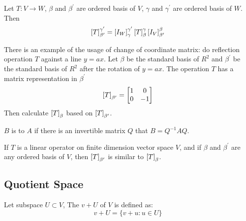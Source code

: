 \begin{theorem} \label{specialchangeofcoordinates}
	Let $T:V\rightarrow W$, $\beta$ and $\beta^\prime$ are ordered basis of $V$, $\gamma$ and $\gamma^\prime$ are ordered basis of $W$. Then
	\begin{equation}
		\coordinate{T}_{\beta^\prime}^{\gamma^\prime} = \coordinate{I_W}_\gamma^{\gamma^\prime} \coordinate{T}_\beta^\gamma \coordinate{I_V}_{\beta^\prime}^\beta
	\end{equation}
\end{theorem}


\begin{example}
There is an example of the usage of change of coordinate matrix: do reflection operation $T$ against a line $y = a x$. Let $\beta$ be the standard basis of $R^2$ and $\beta^\prime$ be the standard basis of $R^2$ after the rotation of $y = a x$. The operation $T$ has a matrix representation in $\beta^\prime$
	\begin{equation*}
		\coordinate{T}_{\beta^\prime} = \begin{bmatrix}
			1 & 0 \\
			0 & -1
		\end{bmatrix}		
	\end{equation*}
	Then calculate $\coordinate{T}_\beta$ based on $\coordinate{T}_{\beta^\prime}$.    
\end{example}

	



\begin{definition}
	$B$ is  to $A$ if there is an invertible matrix $Q$ that $B = Q^{-1} A Q$.
\end{definition}

\begin{theorem}
If $T$ is a linear operator on finite dimension vector space $V$, and if $\beta$ and $\beta^\prime$ are any ordered basis of $V$, then $\coordinate{T}_{\beta^\prime}$ is similar to $\coordinate{T}_\beta$.    
\end{theorem}




\subsection{Quotient Space}

\begin{definition}
    Let subspace $U \subset V$, The   $v + U$ of $V$ is defined as:
    \begin{equation}
        v + U = \{ v + u: u \in U\}
    \end{equation}    
\end{definition}

